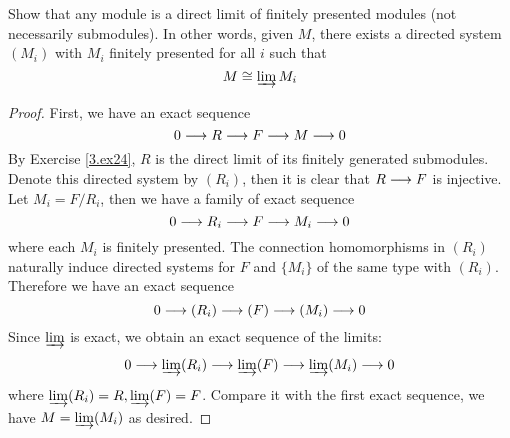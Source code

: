   \begin{ex}
    Show that any module is a direct limit of finitely presented modules (not necessarily submodules). In other words, given $M$, there exists a directed system $(M_i)$ with $M_i$ finitely presented for all $i$ such that
    \begin{equation*}
      M\cong\operatorname*{\underrightarrow{\lim}} M_i
    \end{equation*}
  \end{ex}
  \begin{proof}
    First, we have an exact sequence
    \begin{equation*}
      0\longrightarrow R\longrightarrow F\longrightarrow M\longrightarrow 0
    \end{equation*}
    By Exercise \ref{3.ex24}, $R$ is the direct limit of its finitely generated submodules. Denote this directed system by $(R_i)$, then it is clear that $R\longrightarrow F$ is injective. Let $M_i=F/R_i$, then we have a family of exact sequence
    \begin{equation*}
      0\longrightarrow R_i\longrightarrow F\longrightarrow M_i\longrightarrow 0
    \end{equation*}
    where each $M_i$ is finitely presented. The connection homomorphisms in $(R_i)$ naturally induce directed systems for $F$ and $\{M_i\}$ of the same type with $(R_i)$. Therefore we have an exact sequence
    \begin{equation*}
      0\longrightarrow (R_i)\longrightarrow (F)\longrightarrow (M_i)\longrightarrow 0
    \end{equation*}
    Since $\operatorname*{\underrightarrow{\lim}}$ is exact, we obtain an exact sequence of the limits:
    \begin{equation*}
      0\longrightarrow \operatorname*{\underrightarrow{\lim}}(R_i)\longrightarrow \operatorname*{\underrightarrow{\lim}}(F)\longrightarrow \operatorname*{\underrightarrow{\lim}}(M_i)\longrightarrow 0
    \end{equation*}
    where $\operatorname*{\underrightarrow{\lim}}(R_i)=R, \operatorname*{\underrightarrow{\lim}}(F)=F$. Compare it with the first exact sequence, we have $M=\operatorname*{\underrightarrow{\lim}}(M_i)$ as desired.
  \end{proof}

